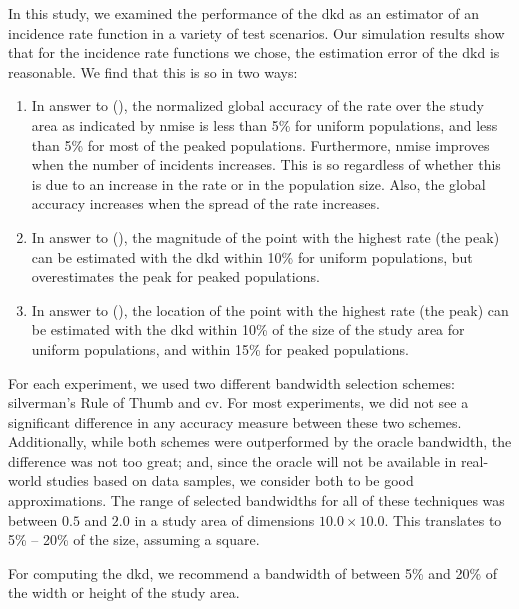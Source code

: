 


In this study,
we examined the performance of the \acrfull{dkd} as an estimator of an incidence rate function in a variety of test scenarios.
Our simulation results show that for the \gls{incidence rate} functions we chose,
the estimation error of the \gls{dkd} is reasonable.
We find that this is so in two ways:
\begin{enumerate}
    \item In answer to  (),
    the normalized global accuracy
    of the rate over the study area as indicated by \gls{nmise}
    is less than 5\% for uniform populations,
    and less than 5\% for most of the peaked populations.
    Furthermore, \gls{nmise} improves when the number of incidents increases.
    This is so regardless of whether this is due to an increase in the rate or in the population size.
    Also, the global accuracy increases when the spread of the rate increases.
    \item In answer to  (),
    the magnitude of the point with the highest rate (the peak) can be estimated with the \gls{dkd}
    within 10\% for uniform populations,
    but overestimates the peak for peaked populations.
    \item In answer to  (),
    the location of the point with the highest rate (the peak) can be estimated with the \gls{dkd}
    within 10\% of the size of the study area for uniform populations,
    and within 15\% for peaked populations.
\end{enumerate}

For each experiment,
we used two different bandwidth selection schemes:
\gls{silverman}'s Rule of Thumb and \acrfull{cv}.
For most experiments,
we did not see a significant difference in any accuracy measure between these two schemes.
Additionally,
while both schemes were outperformed by the \gls{oracle bandwidth},
the difference was not too great;
and, since the \gls{oracle} will not be available in real-world studies based on data samples,
we consider both to be good approximations.
The range of selected bandwidths for all of these techniques was between $0.5$ and $2.0$ in a study area of dimensions $10.0 \times 10.0$.
This translates to 5\% -- 20\% of the size, assuming a square.
\begin{rec}
    \label{rec:bandwidth}
    For computing the \gls{dkd}, we recommend a bandwidth of between 5\% and 20\% of the width or height of the study area.
\end{rec}

